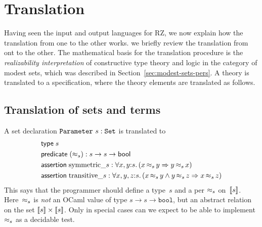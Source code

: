 \section{Translation}
\label{sec:translation}

Having seen the input and output languages for RZ,
%
\iflong
we now explain how the translation from one to the other works.
\else
we briefly review the translation from ont to the other.
\fi
%
The mathematical basis for the translation procedure is the
\emph{realizability interpretation} of constructive type theory and
logic in the category of modest sets, which was described in
Section~\ref{sec:modest-sets-pers}. A theory is translated to a
specification, where the theory elements are translated as follows.



\subsection{Translation of sets and terms}
\label{sec:transl-sets-terms}

A set declaration $\mathtt{Parameter}\ s : \mathtt{Set}$ is translated to
%
\begin{align*}
  & \otyspec{s} \\
  & \opropspec{({\approx_{s}})}{\oarrow{s}{\oarrow{s}{\oProp}}}\\
  & \oassertion{\mathrm{symmetric}\_{s}}{
    \oforall{x,y}{s}{(\oimply{\oper{s}{x}{y}}{\oper{s}{y}{x}})}
  }
  \\
  & \oassertion{\mathrm{transitive}\_{s}}{
    \oforall{x,y,z}{s}{(
      \oimply{
        \oper{s}{x}{y} \land \oper{s}{y}{z}
      }{\oper{s}{x}{z}}
      )}
  }
\end{align*}
%
This says that the programmer should define a type~$s$ and a per
$\approx_s$ on~$[\![s]\!]$. Here~$\approx_s$ is \emph{not} an OCaml value
of type $s \to s \to \mathtt{bool}$, but an abstract relation on the
set $[\![s]\!] \times [\![s]\!]$. Only in special cases can we
expect to be able to implement~$\approx_s$ as a decidable test.  


